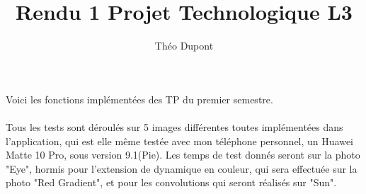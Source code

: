 \documentclass[12pt]{article}
\begin{document}
\title{Rendu 1 Projet Technologique L3}
\author{Théo Dupont}
\maketitle


\bigskip

Voici les fonctions implémentées des TP du premier semestre.\\
\\
Tous les tests sont déroulés sur 5 images différentes toutes implémentées dans l'application,
qui est elle même testée avec mon téléphone personnel, un Huawei Matte 10 Pro, sous version 9.1(Pie).
Les temps de test donnés seront sur la photo "Eye", hormis pour l'extension de dynamique en couleur, 
qui sera effectuée sur la photo "Red Gradient", et pour les convolutions qui seront réalisés sur "Sun".\\
\\
\\
\end{document}

